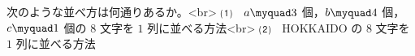 次のような並べ方は何通りあるか。<br>
⑴　$a\myquad 3$ 個，$b\myquad 4$ 個，$c\myquad 1$ 個の $8$ 文字を $1$ 列に並べる方法<br>
⑵　$\mathrm{HOKKAIDO}$ の $8$ 文字を $1$ 列に並べる方法
